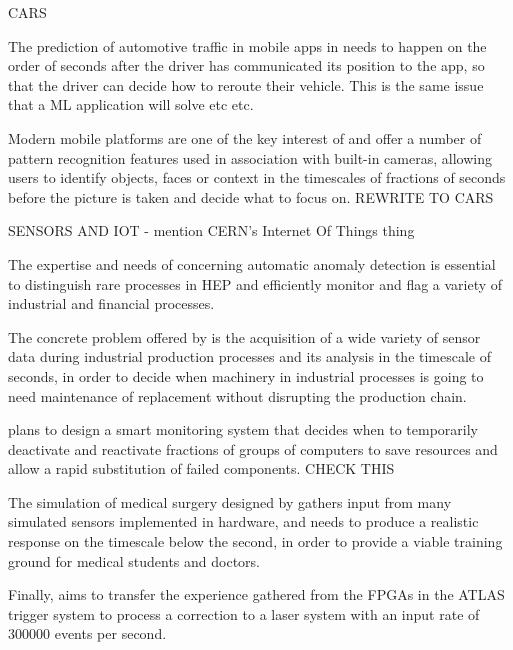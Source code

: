 CARS

The prediction of automotive traffic in mobile apps in \ximantisentity needs to happen on the order of seconds
after the driver has communicated its position to the app, so that the driver can decide how
to reroute their vehicle. This is the same issue that a ML application will solve etc etc. 

Modern mobile platforms are one of the key interest of \fleetmaticsentity and
offer a number of pattern recognition features used in association with built-in cameras, 
allowing users to identify objects, faces or context in the timescales of fractions of seconds before the picture is taken
and decide what to focus on. REWRITE TO CARS




SENSORS AND IOT - mention CERN's Internet Of Things thing
 
The expertise and needs of \ibmentity concerning automatic anomaly detection is essential to 
distinguish rare processes in HEP and efficiently monitor and flag a variety of industrial and financial processes. 

The concrete problem offered by \lightboxentity is the 
acquisition of a wide variety of sensor data during industrial production
processes and its analysis in the timescale of seconds, in order to decide when machinery
in industrial processes is going to need maintenance of replacement without 
disrupting the production chain. 

\wildtreeentity plans to design a smart monitoring system 
that decides when to temporarily deactivate and reactivate fractions of groups of 
computers to save resources and allow a rapid substitution of failed components. CHECK THIS


The simulation of medical surgery designed by \cathientity
gathers input from many simulated sensors implemented in hardware, and needs to produce
a realistic response on the timescale below the second, in order to provide a viable training
ground for medical students and doctors. 

Finally, \heidelberginstrumentsentity aims to
transfer the experience gathered from the FPGAs in the ATLAS trigger system to process a correction to a laser system with
an input rate of 300000 events per second. 






